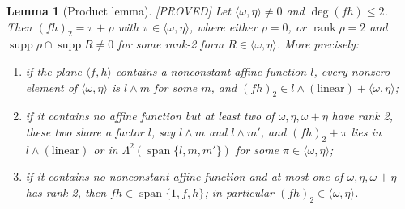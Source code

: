 \documentclass[11pt,a4paper]{article}
\theoremstyle{plain}
\newtheorem{lemma}[theorem]{Lemma}
\theoremstyle{definition}
\theoremstyle{remark}
\newcommand{\Span}{\operatorname{span}}
\newcommand{\supp}{\operatorname{supp}}
\newcommand{\rk}{\operatorname{rank}}
\newcommand{\Lam}{\Lambda^{2}}
\newcommand{\status}[1]{\hfill\textsf{[#1]}}
\begin{document}
\begin{lemma}[Product lemma]\label{lem:P}\status{PROVED}
Let $\langle\omega,\eta\rangle\neq0$ and $\deg(fh)\le 2$. Then $(fh)_2=\pi+\rho$ with $\pi\in\langle\omega,\eta\rangle$, where either $\rho=0$, or $\rk\rho=2$ and $\supp\rho\cap\supp R\neq0$ for some rank-2 form $R\in\langle\omega,\eta\rangle$. More precisely:
\begin{enumerate}[(P1)]
\item if the plane $\langle f,h\rangle$ contains a nonconstant affine function $l$, every nonzero element of $\langle\omega,\eta\rangle$ is $l\wedge m$ for some $m$, and $(fh)_2\in l\wedge(\text{linear})+\langle\omega,\eta\rangle$;
\item if it contains no affine function but at least two of $\omega,\eta,\omega+\eta$ have rank 2, these two share a factor $l$, say $l\wedge m$ and $l\wedge m'$, and $(fh)_2+\pi$ lies in $l\wedge(\text{linear})$ or in $\Lam(\Span\{l,m,m'\})$ for some $\pi\in\langle\omega,\eta\rangle$;
\item if it contains no nonconstant affine function and at most one of $\omega,\eta,\omega+\eta$ has rank 2, then $fh\in\Span\{1,f,h\}$; in particular $(fh)_2\in\langle\omega,\eta\rangle$.
\end{enumerate}
\end{lemma}
\end{document}
